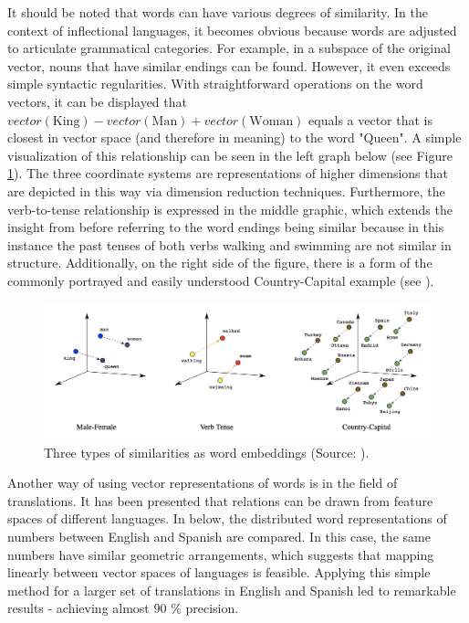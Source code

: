 \documentclass[
]{krantz}
\begin{document}
It should be noted that words can have various degrees of similarity. In
the context of inflectional languages, it becomes obvious because words
are adjusted to articulate grammatical categories. For example, in a
subspace of the original vector, nouns that have similar endings can be
found. However, it even exceeds simple syntactic regularities. With
straightforward operations on the word vectors, it can be displayed that
\(vector(\text{King}) - vector(\text{Man}) + vector(\text{Woman})\) equals a vector that
is closest in vector space (and therefore in meaning) to the word
"Queen". A simple visualization of this relationship can be seen in
the left graph below (see Figure \ref{fig:embedVectors}). The three coordinate systems are
representations of higher dimensions that are depicted in this way via
dimension reduction techniques. Furthermore, the verb-to-tense
relationship is expressed in the middle graphic, which extends the
insight from before referring to the word endings being similar because
in this instance the past tenses of both verbs walking and swimming are
not similar in structure. Additionally, on the right side of the figure,
there is a form of the commonly portrayed and easily understood
Country-Capital example (see \citet{Mikolov2013}).

\begin{figure}

{\centering \includegraphics[width=1\linewidth]{./figures/01-01-nlp/embed_vectors_google} 

}

\caption{Three types of similarities as word embeddings (Source: \citet{Google2022}).}\label{fig:embedVectors}
\end{figure}



Another way of using vector representations of words is in the field of
translations. It has been presented that relations can be drawn from
feature spaces of different languages. In below, the distributed word
representations of numbers between English and Spanish are compared. In
this case, the same numbers have similar geometric arrangements, which
suggests that mapping linearly between vector spaces of languages is
feasible. Applying this simple method for a larger set of translations
in English and Spanish led to remarkable results - achieving almost 90 \%
precision.
\end{document}
